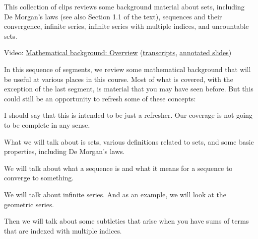\documentclass[pdftex, brazil, 12pt, twoside]{article}
\begin{document}
This collection of clips reviews some background material about sets, including
De Morgan's laws (see also Section 1.1 of the text), sequences and their
convergence, infinite series, infinite series with multiple indices, and
uncountable sets.

Video: \href{https://www.youtube.com/watch?v=q2cHGd\_MP\_4}{Mathematical background: Overview}
(\href{Unit-1/02\_mathematical\_background/mb\_1\_transcripts.pdf}{transcripts},
\href{Unit-1/02\_mathematical\_background/mb\_overview\_annotated\_slides.pdf}{annotated slides})

In this sequence of segments, we review some mathematical
background that will be useful at various
places in this course.
Most of what is covered, with the exception of the last
segment, is material that you may have seen before.
But this could still be an opportunity to refresh some of
these concepts:

\begin{figure}[H]
  \begin{center}
  \end{center}
\end{figure}

I should say that this is intended
to be just a refresher.
Our coverage is not going to be complete in any sense.

What we will talk about is sets, various definitions
related to sets, and some basic properties, including De
Morgan's laws.

We will talk about what a sequence is and what it means
for a sequence to converge to something.

We will talk about infinite series.
And as an example, we will look at the geometric series.

Then we will talk about some subtleties that arise when you
have sums of terms that are indexed with multiple indices.
\end{document}
